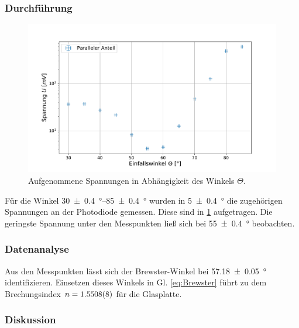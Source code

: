 	\subsubsection*{Durchführung}
		
		\begin{figure}[ht]
			\centering
			\includegraphics[width=\textwidth]{data/Spiegel.pdf}
			\caption{Aufgenommene Spannungen in Abhängigkeit des Winkels $\Theta$.}
			\label{fig:GlasplatteWinkel}	
		\end{figure}
		Für die Winkel \SIrange{30+-0,4}{85+-0,4}{\degree} wurden in \SI{5+-0,4}{\degree} die zugehörigen Spannungen an der Photodiode gemessen.
		Diese sind in \ref{fig:GlasplatteWinkel} aufgetragen.
		Die geringste Spannung unter den Messpunkten ließ sich bei \SI{55+-0,4}{\degree} beobachten.
	
	\subsubsection*{Datenanalyse}
		
		Aus den Messpunkten lässt sich der Brewster-Winkel bei \SI{57,18+-0,05}{\degree} identifizieren. %
		Einsetzen dieses Winkels in Gl. \ref{eq:Brewster} führt zu dem Brechungsindex $n = \SI{1,5508+-0,0008}{}$ für die Glasplatte.
	
	\subsubsection*{Diskussion}
		
